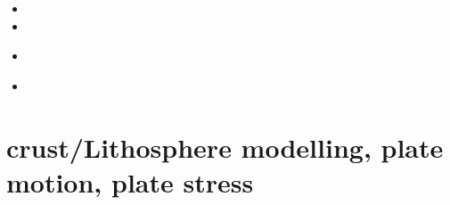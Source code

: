 \begin{small}
\begin{itemize}
\item[\twothousandthirteen]
\item[\twothousandeighteen]
\item[\twothousandtwentythree]
 \\
\item[\twothousandtwentysix]
\end{itemize}
\end{small}





\section{crust/Lithosphere modelling, plate motion, plate stress}

